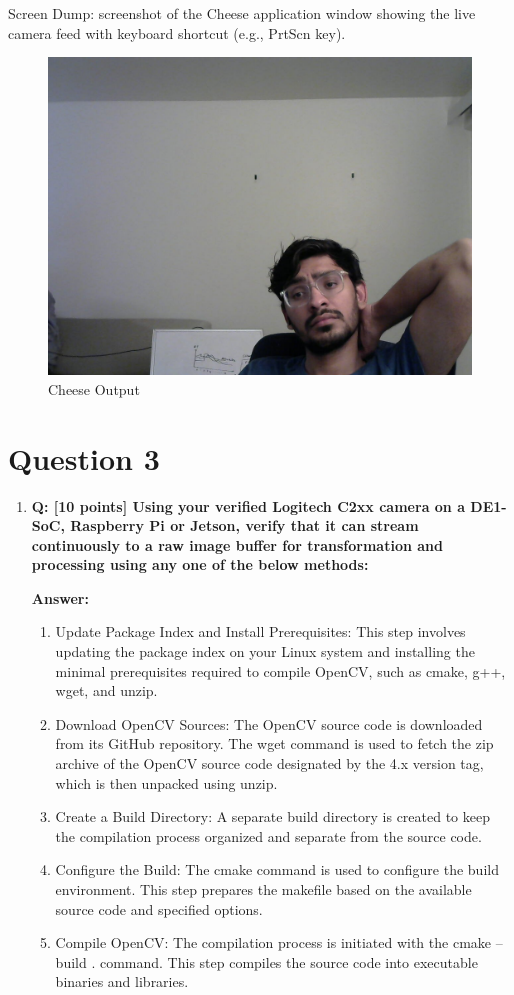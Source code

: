 \documentclass[a4paper,11pt]{article}%
\newenvironment{qanda}{\setlength{\parindent}{0pt}}{\bigskip}
\newcommand{\Q}{\bigskip\bfseries Q: }
\newcommand{\A}{\par\textbf{Answer: } \normalfont}
\begin{document}
\begin{qanda}
\begin{enumerate}
			Screen Dump: screenshot of the Cheese application window showing the live camera feed with keyboard shortcut (e.g., PrtScn key).
			\begin{figure}[H]
				\centering
				\includegraphics[scale=0.35]{figures/cheese.jpg}
				\caption{Cheese Output}
			\end{figure}


	\end{enumerate}




	\section{Question 3}
	\begin{enumerate}
		\item[] \Q [10 points] Using your verified Logitech C2xx camera on a DE1-SoC, Raspberry Pi or Jetson, verify
			that it can stream continuously to a raw image buffer for transformation and processing using any
			one of the below methods:
			\A
			\begin{enumerate}
				\item Update Package Index and Install Prerequisites: This step involves updating the package index on your Linux system and installing the minimal prerequisites required to compile OpenCV, such as cmake, g++, wget, and unzip.
				\item Download OpenCV Sources: The OpenCV source code is downloaded from its GitHub repository. The wget command is used to fetch the zip archive of the OpenCV source code designated by the 4.x version tag, which is then unpacked using unzip.
				\item Create a Build Directory: A separate build directory is created to keep the compilation process organized and separate from the source code.
				\item Configure the Build: The cmake command is used to configure the build environment. This step prepares the makefile based on the available source code and specified options.
				\item Compile OpenCV: The compilation process is initiated with the cmake --build . command. This step compiles the source code into executable binaries and libraries.
			\end{enumerate}



\end{enumerate}
\end{qanda}
\end{document}
